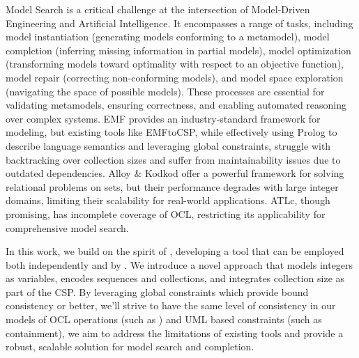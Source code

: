 Model Search is a critical challenge at the intersection of Model-Driven Engineering and Artificial Intelligence. It encompasses a range of tasks, including model instantiation (generating models conforming to a metamodel), model completion (inferring missing information in partial models), model optimization (transforming models toward optimality with respect to an objective function), model repair (correcting non-conforming models), and model space exploration (navigating the space of possible models). These processes are essential for validating metamodels, ensuring correctness, and enabling automated reasoning over complex systems.
EMF provides an industry-standard framework for modeling, but existing tools like EMFtoCSP, while effectively using Prolog to describe language semantics and leveraging global constraints, struggle with backtracking over collection sizes and suffer from maintainability issues due to outdated dependencies. Alloy & Kodkod offer a powerful framework for solving relational problems on sets, but their performance degrades with large integer domains, limiting their scalability for real-world applications. ATLc, though promising, has incomplete coverage of OCL, restricting its applicability for comprehensive model search.

In this work, we build on the spirit of \atlc, developing a tool that can be employed both independently and by \atlc. We introduce a novel approach that models integers as variables, encodes sequences and collections, and integrates collection size as part of the CSP. By leveraging global constraints which provide bound consistency or better, we'll strive to have the same level of consistency in our models of OCL operations (such as ) and UML based constraints (such as containment), we aim to address the limitations of existing tools and provide a robust, scalable solution for model search and completion.

